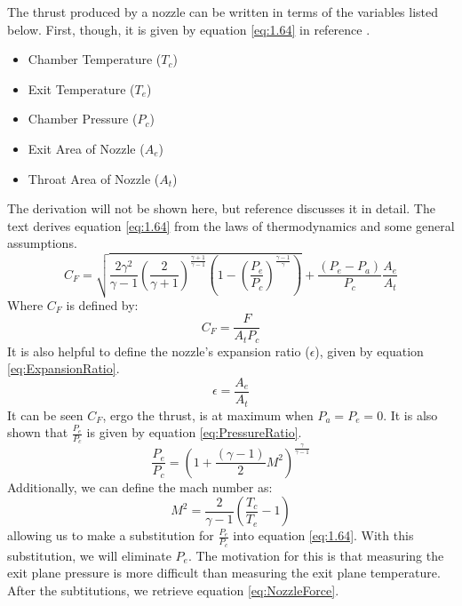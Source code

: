 The thrust produced by a nozzle can be written in terms of the variables listed below. First, though, it is given by equation \ref{eq:1.64} in reference \cite{RocketPropulsion}.
\begin{itemize}
\item Chamber Temperature ($T_c$)
\item Exit Temperature ($T_e$)
\item Chamber Pressure ($P_c$)
\item Exit Area of Nozzle ($A_e$)
\item Throat Area of Nozzle ($A_t$)
\end{itemize}%
The derivation will not be shown here, but reference \cite{RocketPropulsion} discusses it in detail. The text derives equation \ref{eq:1.64} from the laws of thermodynamics and some general assumptions.
\begin{equation}\label{eq:1.64}
C_F= \sqrt{\frac{2\gamma^2}{\gamma-1}\left(\frac{2}{\gamma+1}\right)^{\frac{\gamma+1}{\gamma-1}}\left(1-\left(\frac{P_e}{P_c}\right)^{\frac{\gamma-1}{\gamma}}\right)}+\frac{\left(P_e-P_a\right)}{P_c}\frac{A_e}{A_t}
\end{equation}%
%
Where $C_F$ is defined by:
\begin{equation}\label{eq:ThrustCoefficient}
C_F=\frac{F}{A_tP_c}
\end{equation}
It is also helpful to define the nozzle's expansion ratio ($\epsilon$), given by equation \ref{eq:ExpansionRatio}.
\begin{equation}\label{eq:ExpansionRatio}
\epsilon=\frac{A_e}{A_t}
\end{equation}%
It can be seen $C_F$, ergo the thrust, is at maximum when $P_a=P_e=0$. It is also shown that $\frac{P_e}{P_c}$ is given by equation \ref{eq:PressureRatio}.
\begin{equation}\label{eq:PressureRatio}
\frac{P_e}{P_c}=\left(1+\frac{(\gamma-1)}{2}M^2\right)^{\frac{\gamma}{\gamma-1}}
\end{equation}%
%
Additionally, we can define the mach number as:
\begin{equation}\label{eq:MachNumber}
M^2=\frac{2}{\gamma-1}\left(\frac{T_c}{T_e}-1\right)
\end{equation}
allowing us to make a substitution for $\frac{P_e}{P_c}$ into equation \ref{eq:1.64}. With this substitution, we will eliminate $P_e$. The motivation for this is that measuring the exit plane pressure is more difficult than measuring the exit plane temperature. After the subtitutions, we retrieve equation \ref{eq:NozzleForce}.
